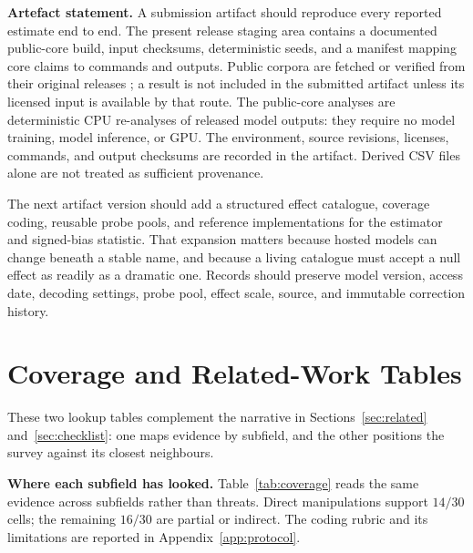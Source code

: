 \documentclass[11pt]{article}
\begin{document}
\textbf{Artefact statement.} A submission artifact should reproduce every
reported estimate end to end. The present release staging area contains a
documented public-core build, input checksums, deterministic seeds, and a
manifest mapping core claims to commands and outputs. Public corpora are fetched
or verified from their original releases
\cite{polo2024efficient,scherrer2023evaluating,zhengmt2023judging}; a result is
not included in the submitted artifact unless its licensed input is available by
that route. The public-core analyses are deterministic CPU re-analyses of
released model outputs: they require no model training, model inference, or GPU.
The environment, source revisions, licenses, commands, and output checksums are
recorded in the artifact. Derived CSV files alone are not treated as sufficient
provenance.

The next artifact version should add a structured effect catalogue, coverage
coding, reusable probe pools, and reference implementations for the estimator
and signed-bias statistic. That expansion matters because hosted models can
change beneath a stable name, and because a living catalogue must accept a null
effect as readily as a dramatic one. Records should preserve model version,
access date, decoding settings, probe pool, effect scale, source, and immutable
correction history.

\balance
\section{Coverage and Related-Work Tables}
\label{app:tables}

These two lookup tables complement the narrative in Sections~\ref{sec:related}
and~\ref{sec:checklist}: one maps evidence by subfield, and the other positions
the survey against its closest neighbours.

\textbf{Where each subfield has looked.} Table~\ref{tab:coverage} reads the same
evidence across subfields rather than threats. Direct manipulations support
$14/30$ cells; the remaining $16/30$ are partial or indirect. The coding rubric
and its limitations are reported in Appendix~\ref{app:protocol}.
\end{document}

